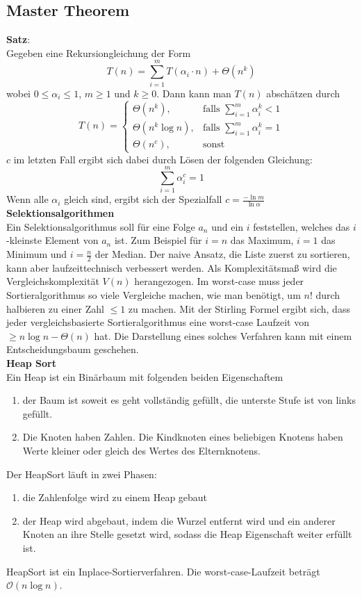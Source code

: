 \documentclass[a4paper, 12pt]{article}
\begin{document}
	\subsection{Master Theorem}
	\textbf{Satz}:\\
	Gegeben eine Rekursiongleichung der Form \[T(n) = \sum_{i=1}^m T(\alpha_i\cdot n) + \Theta(n^k)\] wobei $0 \leq \alpha_i \leq 1$, $m\geq 1$ und $k\geq 0$. Dann kann man $T(n)$ abschätzen durch \[T(n) = \begin{cases}
		\Theta(n^k), & \text{falls } \sum_{i=1}^m \alpha_i^k < 1\\
		\Theta(n^k \log n), & \text{falls } \sum_{i=1}^m \alpha_i^k = 1\\
		\Theta(n^c), & \text{sonst}
	\end{cases}\]
	$c$ im letzten Fall ergibt sich dabei durch Lösen der folgenden Gleichung: \[\sum_{i=1}^m \alpha_i^c = 1\] Wenn alle $\alpha_i$ gleich sind, ergibt sich der Spezialfall $c = \frac{-\ln m}{\ln \alpha}$\\
	\textbf{Selektionsalgorithmen}\\
	Ein Selektionsalgorithmus soll für eine Folge $a_n$ und ein $i$ feststellen, welches das $i$-kleinste Element von $a_n$ ist. Zum Beispiel für $i=n$ das Maximum, $i=1$ das Minimum und $i=\frac{n}{2}$ der Median. Der naive Ansatz, die Liste zuerst zu sortieren, kann aber laufzeittechnisch verbessert werden. Als Komplexitätsmaß wird die Vergleichskomplexität $V(n)$ herangezogen. Im worst-case muss jeder Sortieralgorithmus so viele Vergleiche machen, wie man benötigt, um $n!$ durch halbieren zu einer Zahl $\leq 1$ zu machen. Mit der Stirling Formel ergibt sich, dass jeder vergleichsbasierte Sortieralgorithmus eine worst-case Laufzeit von $\geq n\log n - \Theta(n)$ hat. Die Darstellung eines solches Verfahren kann mit einem Entscheidungsbaum geschehen.\\
	\textbf{Heap Sort}\\
	Ein Heap ist ein Binärbaum mit folgenden beiden Eigenschaftem \begin{enumerate}
		\item der Baum ist soweit es geht vollständig gefüllt, die unterste Stufe ist von links gefüllt.
		\item Die Knoten haben Zahlen. Die Kindknoten eines beliebigen Knotens haben Werte kleiner oder gleich des Wertes des Elternknotens.
	\end{enumerate}
	Der HeapSort läuft in zwei Phasen: \begin{enumerate}
		\item die Zahlenfolge wird zu einem Heap gebaut
		\item der Heap wird abgebaut, indem die Wurzel entfernt wird und ein anderer Knoten an ihre Stelle gesetzt wird, sodass die Heap Eigenschaft weiter erfüllt ist.
	\end{enumerate}
	HeapSort ist ein Inplace-Sortierverfahren. Die worst-case-Laufzeit beträgt $\mathcal{O}(n\log n)$.
\end{document}
